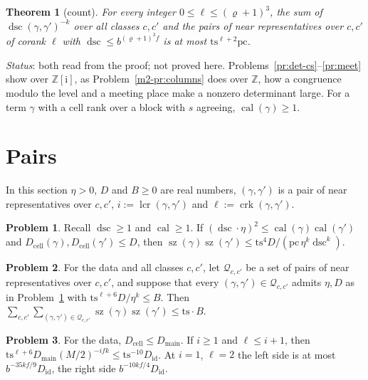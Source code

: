 \documentclass[reqno]{amsart}
\theoremstyle{definition}
\newtheorem{problem}{Problem}[section]
\theoremstyle{plain}
\newtheorem{theorem}{Theorem}[section]
\theoremstyle{remark}
\newcommand{\Z}{{\mathbb{Z}}}
\newcommand{\ii}{\mathrm{i}}
\newcommand{\Did}{D_{\mathrm{id}}}
\newcommand{\Dmain}{D_{\mathrm{main}}}
\newcommand{\Dcell}{D_{\mathrm{cell}}}
\newcommand{\ts}{\mathrm{ts}}
\newcommand{\pc}{\mathrm{pc}}
\newcommand{\sz}{\operatorname{sz}}
\newcommand{\calb}{\operatorname{cal}}
\newcommand{\dsc}{\operatorname{dsc}}
\newcommand{\crk}{\operatorname{crk}}
\newcommand{\lcr}{\operatorname{lcr}}
\begin{document}
\begin{theorem}[count]\label{thm:count}
For every integer \(0\le\ell\le(\varrho+1)^3\), the sum of \(\dsc(\gamma,\gamma')^{-k}\) over all classes \(c,c'\) and the pairs of near representatives over \(c,c'\) of corank \(\ell\) with \(\dsc\le b^{(\varrho+1)^3f}\) is at most \(\ts^{\ell+2}\pc\).
\end{theorem}

\noindent\emph{Status}: both read from the proof; not proved here.  Problems~\ref{pr:det-cs}--\ref{pr:meet} show over \(\Z[\ii]\), as Problem~\ref{m2-pr:columns} does over \(\Z\), how a congruence modulo the level and a meeting place make a nonzero determinant large.  For a term \(\gamma\) with a cell rank over a block with \(s\) agreeing, \(\calb(\gamma)\ge1\).

\section{Pairs}\label{sec:pairs}

In this section \(\eta>0\), \(D\) and \(B\ge0\) are real numbers, \((\gamma,\gamma')\) is a pair of near representatives over \(c,c'\), \(i:=\lcr(\gamma,\gamma')\) and \(\ell:=\crk(\gamma,\gamma')\).

\begin{problem}\label{pr:pair-size}
Recall \(\dsc\ge1\) and \(\calb\ge1\).  If \((\dsc\cdot\eta)^2\le\calb(\gamma)\calb(\gamma')\) and \(\Dcell(\gamma),\Dcell(\gamma')\le D\), then \(\sz(\gamma)\sz(\gamma')\le\ts^4D/(\pc\,\eta^k\dsc^k)\).
\end{problem}

\begin{problem}\label{pr:rule}
For the data and all classes \(c,c'\), let \(\mathcal Q_{c,c'}\) be a set of pairs of near representatives over \(c,c'\), and suppose that every \((\gamma,\gamma')\in\mathcal Q_{c,c'}\) admits \(\eta,D\) as in Problem~\ref{pr:pair-size} with \(\ts^{\ell+6}D/\eta^k\le B\).  Then \(\sum_{c,c'}\sum_{(\gamma,\gamma')\in\mathcal Q_{c,c'}}\sz(\gamma)\sz(\gamma')\le\ts\cdot B\).
\end{problem}

\begin{problem}\label{pr:different-links}
For the data, \(\Dcell\le\Dmain\).  If \(i\ge1\) and \(\ell\le i+1\), then \(\ts^{\ell+6}\Dmain(M/2)^{-ifk}\le\ts^{-10}\Did\).  At \(i=1\), \(\ell=2\) the left side is at most \(b^{-35kf/9}\Did\), the right side \(b^{-10kf/4}\Did\).
\end{problem}
\end{document}
